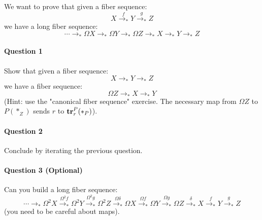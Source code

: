 \documentclass{article}[6pt]%
\newcommand{\U}{{\mathcal U}}
\renewcommand{\r}{\rightarrow}
\newcommand{\tr}{\mathrm{\bf tr}}
\newcommand{\inc}{\mathrm{\bf inc}}
\begin{document}
\begin{Exercise}[title={The long fiber sequence of a map}]
 We want to prove that given a fiber sequence:
 \[X\overset{f}{\r_*} Y\overset{g}{\r_*} Z\] 
 we have a long fiber sequence:
 \[ \cdots \r_*\Omega X \r_* \Omega Y \r_* \Omega Z \r_* X\r_* Y\r_* Z\]
 
 \paragraph{Question 1} Show that given a fiber sequence:
  \[X\r_*Y\r_*Z\] 
  we have a fiber sequence:
   \[\Omega Z\r_*X\r_* Y\] 
(Hint: use the "canonical fiber sequence" exercise. The necessary map from $\Omega Z$ to $P(*_Z)$ sends $r$ to $\tr_r^P(*_P)$).
  
 
 
 \paragraph{Question 2} Conclude by iterating the previous question.
 
 
 \paragraph{Question 3 (Optional)} Can you build a long fiber sequence:
\[\cdots \r_* \Omega^2 X \overset{\Omega^2 f}{\r_*} \Omega^2 Y \overset{\Omega^2 g}{\r_*}\Omega^2 Z \overset{\Omega\delta}{\r_*} \Omega X \overset{\Omega f}{\r_*} \Omega Y \overset{\Omega g}{\r_*} \Omega Z \overset{\delta}{\r_*} X \overset{f}{\r_*} Y\overset{g}{\r_*} Z  \]
 (you need to be careful about maps).
 
\end{Exercise}
\end{document}
